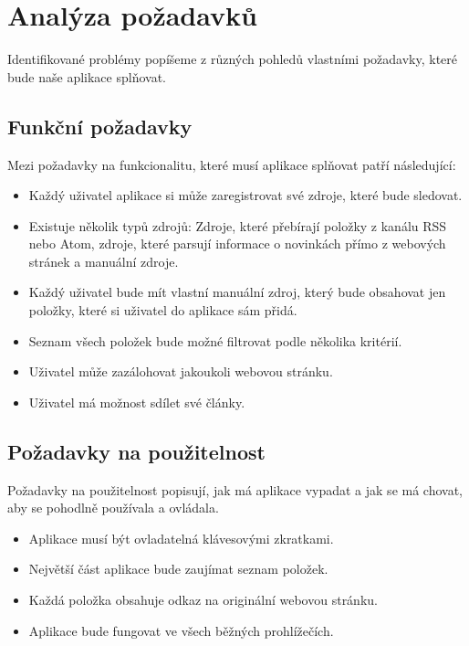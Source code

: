 \section{Analýza požadavků}

Identifikované problémy popíšeme z různých pohledů vlastními požadavky, které bude naše aplikace splňovat.

\subsection{Funkční požadavky}

Mezi požadavky na funkcionalitu, které musí aplikace splňovat patří následující:

\begin{itemize}
    \item Každý uživatel aplikace si může zaregistrovat své zdroje, které bude sledovat.
    \item Existuje několik typů zdrojů: Zdroje, které přebírají položky z kanálu RSS nebo Atom, zdroje, které parsují informace o novinkách přímo z webových stránek a manuální zdroje.
    \item Každý uživatel bude mít vlastní manuální zdroj, který bude obsahovat jen položky, které si uživatel do aplikace sám přidá.
    \item Seznam všech položek bude možné filtrovat podle několika kritérií.
	\item Uživatel může zazálohovat jakoukoli webovou stránku.
	\item Uživatel má možnost sdílet své články.
\end{itemize}

\subsection{Požadavky na použitelnost}

Požadavky na použitelnost popisují, jak má aplikace vypadat a jak se má chovat, aby se pohodlně používala a ovládala.

\begin{itemize}
    \item Aplikace musí být ovladatelná klávesovými zkratkami.
    \item Největší část aplikace bude zaujímat seznam položek.
    \item Každá položka obsahuje odkaz na originální webovou stránku.
    \item Aplikace bude fungovat ve všech běžných prohlížečích.
\end{itemize}

